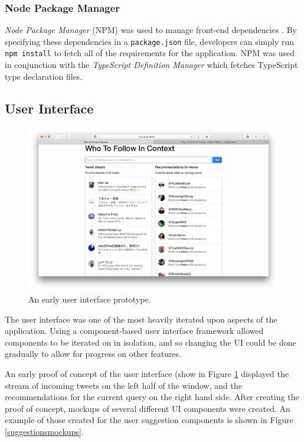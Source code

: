 \documentclass{l4proj}
\newcommand{\code}[1]{\texttt{#1}}
\begin{document}
        \subsubsection{Node Package Manager}
        \textit{Node Package Manager} (NPM) was used to manage front-end dependencies \cite{npm}. By specifying these dependencies in a \code{package.json} file, developers can simply run \code{npm install} to fetch all of the requirements for the application. NPM was used in conjunction with the \textit{TypeScript Definition Manager} which fetches TypeScript type declaration files.
        
        \subsection{User Interface}
\begin{figure}
\centering
\includegraphics[scale=0.24]{initialui.png}
\caption{An early user interface prototype.}
\label{initialui}
\end{figure} 
        
        The user interface was one of the most heavily iterated upon aspects of the application. Using a component-based user interface framework allowed components to be iterated on in isolation, and so changing the UI could be done gradually to allow for progress on other features.
        
        An early proof of concept of the user interface (show in Figure \ref{initialui} displayed the stream of incoming tweets on the left half of the window, and the recommendations for the current query on the right hand side. After creating the proof of concept, mockups of several different UI components were created. An example of those created for the user suggestion components is shown in Figure \ref{suggestionsmockups}.
        
\end{document}

